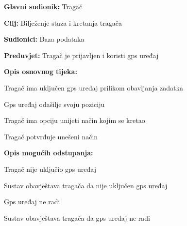 					\noindent {}
					\begin{packed_item}
						
						\item \textbf{Glavni sudionik: }Tragač
						\item  \textbf{Cilj:} Bilježenje staza i kretanja tragača
						\item  \textbf{Sudionici:} Baza podataka
						\item  \textbf{Preduvjet:} Tragač je prijavljen i koristi gps uređaj
						\item  \textbf{Opis osnovnog tijeka:}
						
						\item[] \begin{packed_enum}
							
							\item Tragač ima uključen gps uređaj prilikom obavljanja zadatka
							\item Gps uređaj odašilje svoju poziciju
							\item Tragač ima opciju unijeti način kojim se kretao
							\item Tragač potvrđuje unešeni način
							
						\end{packed_enum}
						
						\item  \textbf{Opis mogućih odstupanja:}
						
						\item[] \begin{packed_item}
							
							\item[1.a] Tragač nije uključio gps uređaj
							\item[] \begin{packed_enum}
								
								\item Sustav obavještava tragača da nije uključen gps uređaj
								
							\end{packed_enum}
							
							\item[2.a] Gps uređaj ne radi
							\item[] \begin{packed_enum}
								
								\item Sustav obavještava tragača da gps uređaj ne radi
								

\end{packed_enum}
\end{packed_item}
\end{packed_item}
